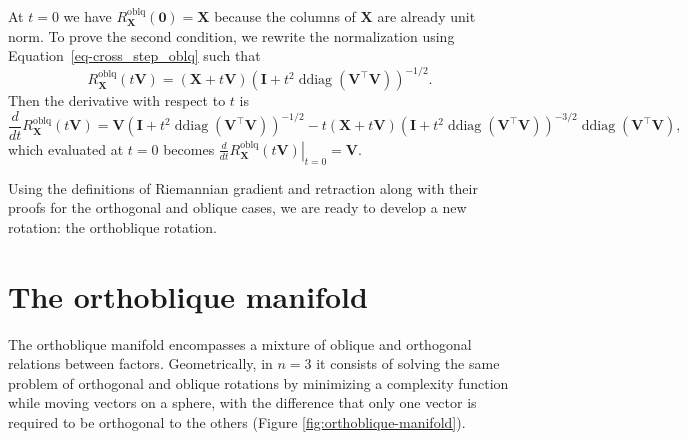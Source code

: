 \documentclass[
  12pt,
  letterpaper,
  article]{scrartcl}
\begin{document}
At \(t=0\) we have
\(R_{\mathbf{X}}^{\mathrm{oblq}}(\mathbf{0}) = \mathbf{X}\) because the
columns of \(\mathbf{X}\) are already unit norm. To prove the second
condition, we rewrite the normalization using
Equation~\ref{eq-cross_step_oblq} such that \[
R_{\mathbf{X}}^{\mathrm{oblq}}(t\mathbf{V}) = (\mathbf{X}+t\mathbf{V})\left(\mathbf{I}+t^2\operatorname{ddiag}(\mathbf{V}^\top \mathbf{V})\right)^{-1/2}.
\] Then the derivative with respect to \(t\) is \[
\frac{d}{dt}R_{\mathbf{X}}^{\mathrm{oblq}}(t\mathbf{V}) = \mathbf{V}\left(\mathbf{I}+t^2\operatorname{ddiag}(\mathbf{V}^\top \mathbf{V})\right)^{-1/2}-t(\mathbf{X}+t\mathbf{V})\left(\mathbf{I}+t^2\operatorname{ddiag}(\mathbf{V}^\top \mathbf{V})\right)^{-3/2}\operatorname{ddiag}(\mathbf{V}^\top \mathbf{V}),
\] which evaluated at \(t=0\) becomes
\(\left.\frac{d}{dt}R_{\mathbf{X}}^{\mathrm{oblq}}(t\mathbf{V})\right|_{t=0} = \mathbf{V}\).

Using the definitions of Riemannian gradient and retraction along with
their proofs for the orthogonal and oblique cases, we are ready to
develop a new rotation: the orthoblique rotation.

\section{The orthoblique manifold}\label{the-orthoblique-manifold}

The orthoblique manifold encompasses a mixture of oblique and orthogonal
relations between factors. Geometrically, in \(n=3\) it consists of
solving the same problem of orthogonal and oblique rotations by
minimizing a complexity function while moving vectors on a sphere, with
the difference that only one vector is required to be orthogonal to the
others (Figure \ref{fig:orthoblique-manifold}).
\end{document}
